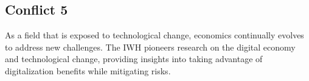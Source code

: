 \documentclass{article}
\begin{document}
\subsection{Conflict 5}
As a field that is exposed to technological change, economics continually evolves to address new challenges. The IWH pioneers research on the digital economy and technological change, providing insights into taking advantage of digitalization benefits while mitigating risks.

\end{document}
